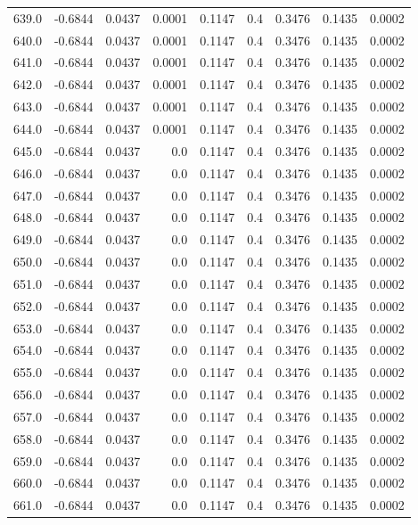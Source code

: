 \begin{longtable}{lrrrrrrrr}
639.0 & -0.6844 & 0.0437 & 0.0001 & 0.1147 & 0.4 & 0.3476 & 0.1435 & 0.0002 \\
640.0 & -0.6844 & 0.0437 & 0.0001 & 0.1147 & 0.4 & 0.3476 & 0.1435 & 0.0002 \\
641.0 & -0.6844 & 0.0437 & 0.0001 & 0.1147 & 0.4 & 0.3476 & 0.1435 & 0.0002 \\
642.0 & -0.6844 & 0.0437 & 0.0001 & 0.1147 & 0.4 & 0.3476 & 0.1435 & 0.0002 \\
643.0 & -0.6844 & 0.0437 & 0.0001 & 0.1147 & 0.4 & 0.3476 & 0.1435 & 0.0002 \\
644.0 & -0.6844 & 0.0437 & 0.0001 & 0.1147 & 0.4 & 0.3476 & 0.1435 & 0.0002 \\
645.0 & -0.6844 & 0.0437 & 0.0 & 0.1147 & 0.4 & 0.3476 & 0.1435 & 0.0002 \\
646.0 & -0.6844 & 0.0437 & 0.0 & 0.1147 & 0.4 & 0.3476 & 0.1435 & 0.0002 \\
647.0 & -0.6844 & 0.0437 & 0.0 & 0.1147 & 0.4 & 0.3476 & 0.1435 & 0.0002 \\
648.0 & -0.6844 & 0.0437 & 0.0 & 0.1147 & 0.4 & 0.3476 & 0.1435 & 0.0002 \\
649.0 & -0.6844 & 0.0437 & 0.0 & 0.1147 & 0.4 & 0.3476 & 0.1435 & 0.0002 \\
650.0 & -0.6844 & 0.0437 & 0.0 & 0.1147 & 0.4 & 0.3476 & 0.1435 & 0.0002 \\
651.0 & -0.6844 & 0.0437 & 0.0 & 0.1147 & 0.4 & 0.3476 & 0.1435 & 0.0002 \\
652.0 & -0.6844 & 0.0437 & 0.0 & 0.1147 & 0.4 & 0.3476 & 0.1435 & 0.0002 \\
653.0 & -0.6844 & 0.0437 & 0.0 & 0.1147 & 0.4 & 0.3476 & 0.1435 & 0.0002 \\
654.0 & -0.6844 & 0.0437 & 0.0 & 0.1147 & 0.4 & 0.3476 & 0.1435 & 0.0002 \\
655.0 & -0.6844 & 0.0437 & 0.0 & 0.1147 & 0.4 & 0.3476 & 0.1435 & 0.0002 \\
656.0 & -0.6844 & 0.0437 & 0.0 & 0.1147 & 0.4 & 0.3476 & 0.1435 & 0.0002 \\
657.0 & -0.6844 & 0.0437 & 0.0 & 0.1147 & 0.4 & 0.3476 & 0.1435 & 0.0002 \\
658.0 & -0.6844 & 0.0437 & 0.0 & 0.1147 & 0.4 & 0.3476 & 0.1435 & 0.0002 \\
659.0 & -0.6844 & 0.0437 & 0.0 & 0.1147 & 0.4 & 0.3476 & 0.1435 & 0.0002 \\
660.0 & -0.6844 & 0.0437 & 0.0 & 0.1147 & 0.4 & 0.3476 & 0.1435 & 0.0002 \\
661.0 & -0.6844 & 0.0437 & 0.0 & 0.1147 & 0.4 & 0.3476 & 0.1435 & 0.0002 \\

\end{longtable}
